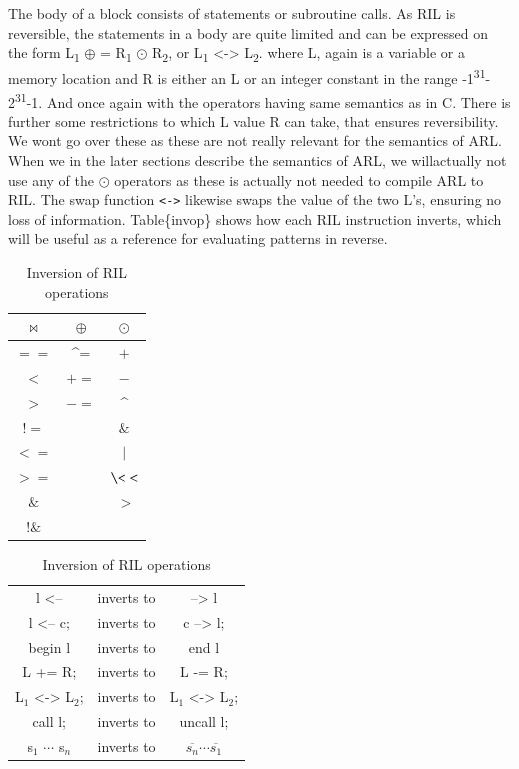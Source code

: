 \documentclass[a4paper]{article}
\begin{document}
The body of a block consists of statements or subroutine calls. As RIL is reversible, the statements in a body are quite limited and can be expressed on the form L\textsubscript{1} \(\oplus\) = R\textsubscript{1} \(\odot\) R\textsubscript{2}, or L\textsubscript{1} <-> L\textsubscript{2}. where L, again is a variable or a memory location and R is either an L or an integer constant in the range -1\textsuperscript{31}-2\textsuperscript{31}-1. And once again with the operators having same semantics as in C. There is further some restrictions to which L value R can take, that ensures reversibility. We wont go over these as these are not really relevant for the semantics of ARL. When we in the later sections describe the semantics of ARL, we willactually not use any of the \(\odot\) operators as these is actually not needed to compile ARL to RIL. The swap function \texttt{<->} likewise swaps the value of the two L's, ensuring no loss of information. Table\{invop\} shows how each RIL instruction inverts, which will be useful as a reference for evaluating patterns in reverse.

\begin{table}[ht]
\begin{minipage}{0.4\textwidth}
\centering
\begin{tabular}{|c|c|c|}
  $\bowtie$ & $\oplus$ & $\odot$ \\
  \hline
$==$  & \textasciicircum = & $+$ \\
$<  $ & $+=$ & $- $  \\
$>  $ & $-=$ & \textasciicircum   \\
$!= $ &    & $\&  $  \\
$<= $ &    & $\vert$     \\
$>= $ &    & $\<< $  \\
$\& $  &    & $\>>$  \\
$!\&$  &    &      \\
\end{tabular}
\caption{RIL operators}
\label{operators}
\end{minipage}
\qquad
\begin{minipage}{0.5\textwidth}
\centering
\begin{tabular}{ccc}
l <-- & inverts to & --> l\\
l <-- c; & inverts to & c --> l;\\
begin l & inverts to & end l\\
L += R; & inverts to & L -= R;\\
L$_1$ <-> L$_2$; & inverts to &L$_1$ <-> L$_2$;\\
call l; & inverts to & uncall l;\\
s$_1$ $\cdots$ s$_n$ & inverts to & $\overline{s_n} \cdots \overline{s_1}$
\end{tabular}
\caption{Inversion of RIL operations}
\label{invop}
\end{minipage}
\end{table}
\end{document}
